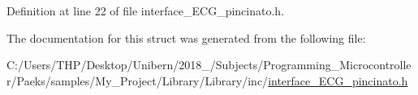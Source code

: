 Definition at line 22 of file interface\+\_\+\+E\+C\+G\+\_\+pincinato.\+h.



The documentation for this struct was generated from the following file\+:\begin{DoxyCompactItemize}
\item 
C\+:/\+Users/\+T\+H\+P/\+Desktop/\+Unibern/2018\+\_/\+Subjects/\+Programming\+\_\+\+Microcontroller/\+Paeks/samples/\+My\+\_\+\+Project/\+Library/\+Library/inc/\mbox{\hyperlink{interface___e_c_g__pincinato_8h}{interface\+\_\+\+E\+C\+G\+\_\+pincinato.\+h}}\end{DoxyCompactItemize}
